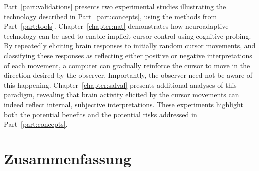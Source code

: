 Part~\ref{part:validations} presents two experimental studies illustrating the technology described in Part~\ref{part:concepts}, using the methods from Part~\ref{part:tools}. Chapter~\ref{chapter:nat} demonstrates how neuroadaptive technology can be used to enable implicit cursor control using cognitive probing. By repeatedly eliciting brain responses to initially random cursor movements, and classifying these responses as reflecting either positive or negative interpretations of each movement, a computer can gradually reinforce the cursor to move in the direction desired by the observer. Importantly, the observer need not be aware of this happening. Chapter~\ref{chapter:salval} presents additional analyses of this paradigm, revealing that brain activity elicited by the cursor movements can indeed reflect internal, subjective interpretations. These experiments highlight both the potential benefits and the potential risks addressed in Part~\ref{part:concepts}.



\cleardoublepage%
%
\chapter*{Zusammenfassung}

